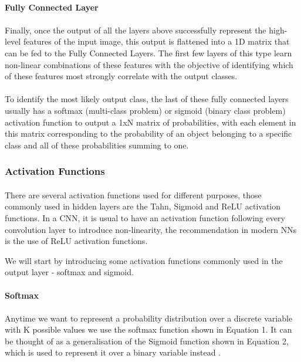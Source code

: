 \documentclass{article}
\begin{document}
\paragraph{Fully Connected Layer}
\paragraph{}
Finally, once the output of all the layers above successfully represent the high-level features of the input image, this output is flattened into a 1D matrix that can be fed to the Fully Connected Layers. The first few layers of this type learn non-linear combinations of these features with the objective of identifying which of these features most strongly correlate with the output classes.
\paragraph{}
To identify the most likely output class, the last of these fully connected layers usually has a softmax (multi-class problem)  or sigmoid (binary class problem) activation function to output a 1xN matrix of probabilities, with each element in this matrix corresponding to the probability of an object belonging to a specific class and all of these probabilities summing to one.


\subsubsection{Activation Functions}
\paragraph{}
There are several activation functions used for different purposes, those commonly used in hidden layers are the Tahn, Sigmoid and ReLU activation functions.
In a CNN, it is usual to have an activation function following every convolution layer to introduce non-linearity, the recommendation in modern NNs is the use of ReLU activation functions\cite{GoodBengCour16}.

We will start by introducing some activation functions commonly used in the output layer - softmax and sigmoid.

\paragraph{Softmax}
\paragraph{}
Anytime we want to represent a probability distribution over a discrete variable with K possible values we use the softmax function shown in Equation 1. It can be thought of as a generalisation of the Sigmoid function shown in Equation 2, which is used to represent it over a binary variable instead \cite{GoodBengCour16}.
\end{document}
